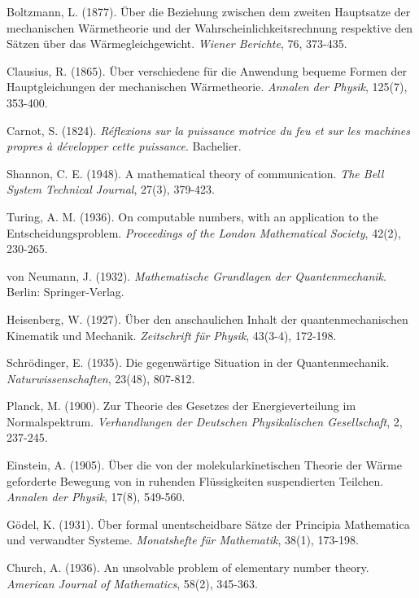 \documentclass{article}
\begin{document}

\begin{thebibliography}{99}

Boltzmann, L. (1877). Über die Beziehung zwischen dem zweiten Hauptsatze der mechanischen Wärmetheorie und der Wahrscheinlichkeitsrechnung respektive den Sätzen über das Wärmegleichgewicht. \textit{Wiener Berichte}, 76, 373-435.

Clausius, R. (1865). Über verschiedene für die Anwendung bequeme Formen der Hauptgleichungen der mechanischen Wärmetheorie. \textit{Annalen der Physik}, 125(7), 353-400.

Carnot, S. (1824). \textit{Réflexions sur la puissance motrice du feu et sur les machines propres à développer cette puissance}. Bachelier.

Shannon, C. E. (1948). A mathematical theory of communication. \textit{The Bell System Technical Journal}, 27(3), 379-423.

Turing, A. M. (1936). On computable numbers, with an application to the Entscheidungsproblem. \textit{Proceedings of the London Mathematical Society}, 42(2), 230-265.

von Neumann, J. (1932). \textit{Mathematische Grundlagen der Quantenmechanik}. Berlin: Springer-Verlag.

Heisenberg, W. (1927). Über den anschaulichen Inhalt der quantenmechanischen Kinematik und Mechanik. \textit{Zeitschrift für Physik}, 43(3-4), 172-198.

Schrödinger, E. (1935). Die gegenwärtige Situation in der Quantenmechanik. \textit{Naturwissenschaften}, 23(48), 807-812.

Planck, M. (1900). Zur Theorie des Gesetzes der Energieverteilung im Normalspektrum. \textit{Verhandlungen der Deutschen Physikalischen Gesellschaft}, 2, 237-245.

Einstein, A. (1905). Über die von der molekularkinetischen Theorie der Wärme geforderte Bewegung von in ruhenden Flüssigkeiten suspendierten Teilchen. \textit{Annalen der Physik}, 17(8), 549-560.

Gödel, K. (1931). Über formal unentscheidbare Sätze der Principia Mathematica und verwandter Systeme. \textit{Monatshefte für Mathematik}, 38(1), 173-198.

Church, A. (1936). An unsolvable problem of elementary number theory. \textit{American Journal of Mathematics}, 58(2), 345-363.


\end{thebibliography}
\end{document}
